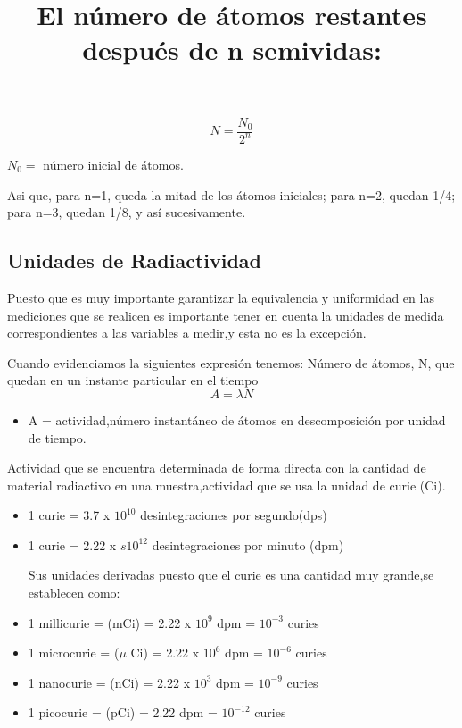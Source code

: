 \documentclass[12pt,fleqn]{book} %
\numberwithin{equation}{section} %
\numberwithin{figure}{section} %
\numberwithin{table}{section} %
\begin{document}
\title{El número de átomos restantes después de n semividas:}
\begin{equation}
 N=\frac{N_{0}}{2^{n}}
\end{equation}

$N_{0}=$ número inicial de átomos.
 
Asi que, para n=1, queda la mitad de los átomos iniciales; para n=2, quedan 1/4; para n=3, quedan 1/8, y así sucesivamente.


\subsection{Unidades de Radiactividad}
Puesto que es muy importante garantizar la equivalencia y uniformidad en las mediciones que se realicen es importante tener en cuenta la unidades de medida correspondientes a las variables a medir,y esta no es la excepción.

Cuando evidenciamos la siguientes expresión tenemos:
Número de átomos, N, que quedan en un instante particular en el tiempo
\begin{equation}
 A= \lambda  N
\end{equation}
\begin{itemize}
\item A = actividad,número instantáneo de átomos en descomposición por unidad de tiempo.
\end{itemize}


Actividad que se encuentra determinada de forma directa con la cantidad de material radiactivo en una muestra,actividad que se usa la unidad de curie (Ci).

\begin{itemize}

\item 1 curie = 3.7 x $10^{10}$ desintegraciones por segundo(dps)
\item 1 curie = 2.22 x $s10^{12}$ desintegraciones por minuto (dpm)

Sus unidades derivadas puesto que el curie es una cantidad muy grande,se establecen como:
\item 1 millicurie = (mCi) = 2.22 x $10^{9}$ dpm = $10^{-3}$ curies
\item 1 microcurie = ($\mu$ Ci) = 2.22 x $10^{6}$ dpm = $10^{-6}$ curies
\item 1 nanocurie = (nCi) = 2.22 x $10^{3}$ dpm = $10^{-9}$ curies
\item 1 picocurie = (pCi) = 2.22 dpm = $10^{-12}$ curies
\end{itemize}
\end{document}
